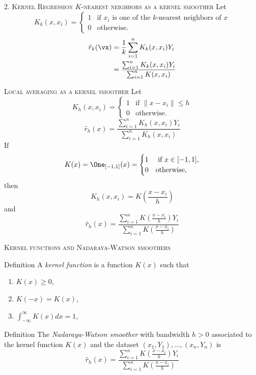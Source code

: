 \documentclass{beamer}
\begin{document}
\begin{frame}{\textsc{2. Kernel Regression}}
    {\large\textsc{$K$-nearest neighbors as a kernel smoother}}
    Let
    \[
        K_k(x, x_i) = \begin{cases}
            1&\text{if $x_i$ is one of the $k$-nearest neighbors of $x$}\\
            0&\text{otherwise.}
        \end{cases}
    \]
    \begin{align*}
        \hat r_k(\vx) &= \frac1k\sum_{i=1}^n K_k(x, x_i)Y_i\\
        &= \frac{\sum_{i=1}^n K_k(x, x_i)Y_i}{\sum_{i=1}^n K(x, x_i)}
    \end{align*}
\end{frame}

\begin{frame}{{\large{\textsc{Local averaging as a kernel smoother}}}}
    Let
    \[
        K_h(x, x_i) = \begin{cases}
            1&\text{if $\|x - x_i\|\leq h$}\\
            0&\text{otherwise.}
        \end{cases}
    \]
    \[
        \hat r_h(x) = \frac{\sum_{i=1}^n K_h(x, x_i)Y_i}{\sum_{i=1}^n K_h(x, x_i)} 
    \]
    If
    \[
        K(x) = \One_{[-1, 1]}(x) = \begin{cases}
            1&\text{ if $x\in[-1, 1]$,}\\
            0&\text{otherwise,}
        \end{cases}
    \]
    then
    \[
        K_h(x, x_i) = K\left(\frac{x - x_i}h\right)
    \]
    and
    \[
        \hat r_h(x) = \frac{\sum_{i=1}^n K\left(\frac{x - x_i}h\right)Y_i}
        {\sum_{i=1}^n K\left(\frac{x - x_i}h\right)} 
        \]
\end{frame}

\begin{frame}{{\large{\textsc{Kernel functions and Nadaraya-Watson smoothers}}}}
    \begin{block}{Definition}
    A \emph{kernel function} is a function $K(x)$ such that
    \begin{enumerate}
        \item $K(x)\geq 0$,
        \item $K(-x) = K(x)$,
        \item $\displaystyle{\int_{-\infty}^\infty K(x)dx = 1}$,
    \end{enumerate}
    \end{block}

    \begin{block}{Definition}
        The \emph{Nadaraya-Watson smoother} with bandwidth $h>0$ associated to the kernel function $K(x)$
        and the dataset $(x_1, Y_1),\ldots,(x_n, Y_n)$ is
        \[
            \hat r_h(x) = \frac{\sum_{i=1}^n K\left(\frac{x - x_i}h\right)Y_i}
            {\sum_{i=1}^n K\left(\frac{x - x_i}h\right)} 
        \]
    \end{block}
\end{frame}
\end{document}

